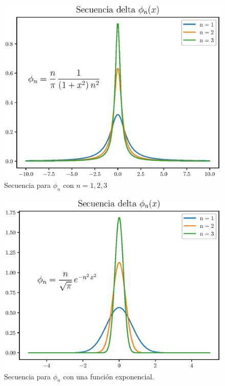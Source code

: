 \documentclass[12pt]{beamer}
\begin{document}
\begin{figure}[H]
    \centering
    \includegraphics[scale=0.8]{Imagenes/secuencia_delta_01.eps}
    \caption{Secuencia para $\phi_{n}$ con $n=1,2,3$}
    \label{fig:plot_secuencia_01}
\end{figure}


\begin{figure}[H]
    \centering
    \includegraphics[scale=0.8]{Imagenes/secuencia_delta_02.eps}
    \caption{Secuencia para $\phi_{n}$ con una función exponencial.}
    \label{fig:plot_secuencia_02}
\end{figure}
\end{document}
